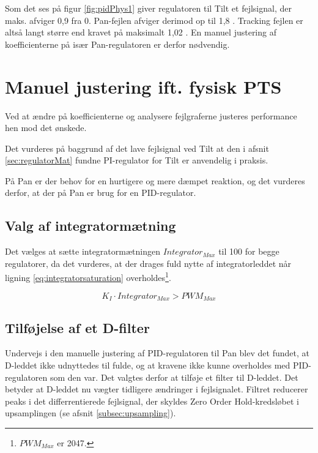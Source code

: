 Som det ses på figur \ref{fig:pidPhys1} giver regulatoren til Tilt et fejlsignal,
der maks. afviger 0,9 \degree{} fra 0.
Pan-fejlen afviger derimod op til 1,8 \degree{}.
Tracking fejlen er altså langt større end kravet på maksimalt 1,02 \degree.
En manuel justering af koefficienterne på især Pan-regulatoren er derfor nødvendig.

\section{Manuel justering ift. fysisk PTS}
Ved at ændre på koefficienterne og analysere fejlgraferne justeres performance 
hen mod det ønskede.

Det vurderes på baggrund af det lave fejlsignal ved Tilt at den i afsnit \ref{sec:regulatorMat} fundne
PI-regulator for Tilt er anvendelig i praksis.

På Pan er der behov for en hurtigere og mere dæmpet reaktion,
og det vurderes derfor, at der på Pan er brug for en PID-regulator.

\subsection{Valg af integratormætning}
Det vælges at sætte integratormætningen \(Integrator_{Max}\) til 100 for begge regulatorer, da det vurderes, at der drages
fuld nytte af integratorleddet når ligning \ref{eq:integratorsaturation} 
overholdes\footnote{\(PWM_{Max}\) er 2047.}.

\begin{equation}
	K_I \cdot Integrator_{Max} > PWM_{Max}
\label{eq:integratorsaturation} 
\end{equation}


\subsection{Tilføjelse af et D-filter}
Undervejs i den manuelle justering af PID-regulatoren til Pan blev det fundet, at D-leddet ikke udnyttedes til fulde,
og at kravene ikke kunne overholdes med PID-regulatoren som den var.
Det valgtes derfor at tilføje et filter til D-leddet. 
Det betyder at D-leddet nu vægter tidligere ændringer i fejlsignalet. 
Filtret reducerer peaks i det differrentierede fejlsignal, der skyldes Zero Order Hold-kredsløbet i upsamplingen (se afsnit \ref{subsec:upsampling}).

